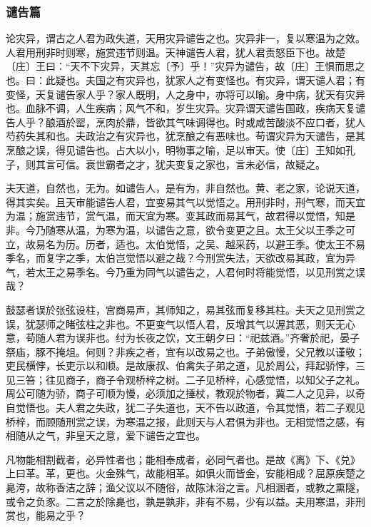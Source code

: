 \documentclass[]{article}
\begin{document}
\hypertarget{header-n605}{%
\subsubsection{谴告篇}\label{header-n605}}

论灾异，谓古之人君为政失道，天用灾异谴告之也。灾异非一，复以寒温为之效。人君用刑非时则寒，施赏违节则温。天神谴告人君，犹人君责怒臣下也。故楚〔庄〕王曰：``天不下灾异，天其忘〔予〕乎！''灾异为谴告，故〔庄〕王惧而思之也。曰：此疑也。夫国之有灾异也，犹家人之有变怪也。有灾异，谓天谴人君；有变怪，天复谴告家人乎？家人既明，人之身中，亦将可以喻。身中病，犹天有灾异也。血脉不调，人生疾病；风气不和，岁生灾异。灾异谓天谴告国政，疾病天复谴告人乎？酿酒於罂，烹肉於鼎，皆欲其气味调得也。时或咸苦酸淡不应口者，犹人芍药失其和也。夫政治之有灾异也，犹烹酿之有恶味也。苟谓灾异为天谴告，是其烹酿之误，得见谴告也。占大以小，明物事之喻，足以审天。使〔庄〕王知如孔子，则其言可信。衰世霸者之才，犹夫变复之家也，言未必信，故疑之。

夫天道，自然也，无为。如谴告人，是有为，非自然也。黄、老之家，论说天道，得其实矣。且天审能谴告人君，宜变易其气以觉悟之。用刑非时，刑气寒，而天宜为温；施赏违节，赏气温，而天宜为寒。变其政而易其气，故君得以觉悟，知是非。今乃随寒从温，为寒为温，以谴告之意，欲令变更之且。太王父以王季之可立，故易名为历。历者，适也。太伯觉悟，之吴、越采药，以避王季。使太王不易季名，而复字之季，太伯岂觉悟以避之哉？今刑赏失法，天欲改易其政，宜为异气，若太王之易季名。今乃重为同气以谴告之，人君何时将能觉悟，以见刑赏之误哉？

鼓瑟者误於张弦设柱，宫商易声，其师知之，易其弦而复移其柱。夫天之见刑赏之误，犹瑟师之睹弦柱之非也。不更变气以悟人君，反增其气以渥其恶，则天无心意，苟随人君为误非也。纣为长夜之饮，文王朝夕曰：``祀兹酒。''齐奢於祀，晏子祭庙，豚不掩俎。何则？非疾之者，宜有以改易之也。子弟傲慢，父兄教以谨敬；吏民横悖，长吏示以和顺。是故康叔、伯禽失子弟之道，见於周公，拜起骄悖，三见三笞；往见商子，商子令观桥梓之树。二子见桥梓，心感觉悟，以知父子之礼。周公可随为骄，商子可顺为慢，必须加之捶杖，教观於物者，冀二人之见异，以奇自觉悟也。夫人君之失政，犹二子失道也，天不告以政道，令其觉悟，若二子观见桥梓，而顾随刑赏之误，为寒温之报，此则天与人君俱为非也。无相觉悟之感，有相随从之气，非皇天之意，爱下谴告之宜也。

凡物能相割截者，必异性者也；能相奉成者，必同气者也。是故《离》下、《兑》上曰革。革，更也。火金殊气，故能相革。如俱火而皆金，安能相成？屈原疾楚之臰洿，故称香洁之辞；渔父议以不随俗，故陈沐浴之言。凡相溷者，或教之熏隧，或令之负豕。二言之於除臰也，孰是孰非，非有不易，少有以益。夫用寒温，非刑赏也，能易之乎？
\end{document}
